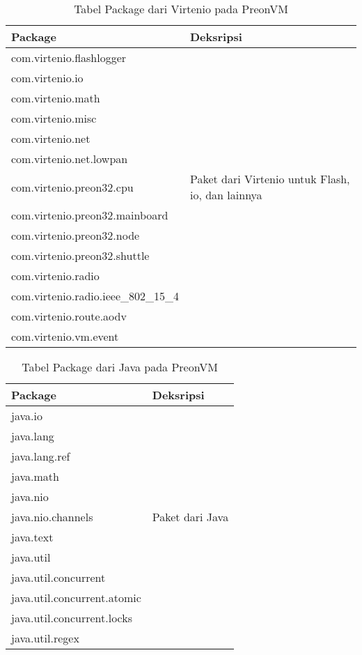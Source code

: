 \begin{table}[H] %
	\centering 
	\caption{Tabel Package dari Virtenio pada PreonVM}
	\label{tab:preonvm_virtenio_packages1}
	\begin{tabular}{|p{8cm}|p{8cm}|}
	\hline
		Package & Deksripsi \\
    \hline
com.virtenio.flashlogger	&\\
com.virtenio.io	 &\\
com.virtenio.math &\\
com.virtenio.misc	 &\\
com.virtenio.net	& \\
com.virtenio.net.lowpan	 &\\
com.virtenio.preon32.cpu	  & Paket dari Virtenio untuk Flash, io, dan lainnya\\
com.virtenio.preon32.mainboard	 &\\
com.virtenio.preon32.node	& \\
com.virtenio.preon32.shuttle	& \\
com.virtenio.radio	& \\
com.virtenio.radio.ieee\_802\_15\_4	& \\
com.virtenio.route.aodv	 &\\
com.virtenio.vm.event	& \\
\hline
\end{tabular}
\end{table}

\begin{table}[H] %
	\centering 
	\caption{Tabel Package dari Java pada PreonVM}
	\label{tab:preonvm_java_packages}
	\begin{tabular}{|p{8cm}|p{8cm}|}
	\hline
		Package & Deksripsi \\
    \hline
java.io	 &\\
java.lang	 &\\
java.lang.ref	 &\\
java.math	 &\\
java.nio	& \\
java.nio.channels	 & Paket dari Java\\
java.text	& \\
java.util	& \\
java.util.concurrent	& \\
java.util.concurrent.atomic	& \\
java.util.concurrent.locks	& \\
java.util.regex &\\
\hline
	\end{tabular}
	
\end{table}

